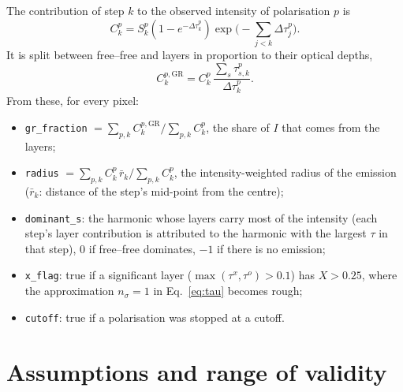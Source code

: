 \documentclass[11pt,a4paper]{article}
\newcommand{\code}[1]{\texttt{#1}}
\begin{document}
The contribution of step $k$ to the observed intensity of polarisation $p$ is
\begin{equation}
  C^p_k=S^p_k\left(1-e^{-\Delta\tau^p_k}\right)\exp\!\Big(-\sum_{j<k}\Delta\tau^p_j\Big).
\end{equation}
It is split between free--free and layers in proportion to their optical depths,
\begin{equation}
  C^{p,\text{GR}}_k=C^p_k\,\frac{\sum_s\tau^p_{s,k}}{\Delta\tau^p_k}.
\end{equation}
From these, for every pixel:
\begin{itemize}
  \item \code{gr\_fraction} $=\sum_{p,k}C^{p,\text{GR}}_k\big/\sum_{p,k}C^p_k$, the share of $I$
        that comes from the layers;
  \item \code{radius} $=\sum_{p,k}C^p_k\,\bar r_k\big/\sum_{p,k}C^p_k$, the intensity-weighted
        radius of the emission ($\bar r_k$: distance of the step's mid-point from the centre);
  \item \code{dominant\_s}: the harmonic whose layers carry most of the intensity (each step's
        layer contribution is attributed to the harmonic with the largest $\tau$ in that step),
        0 if free--free dominates, $-1$ if there is no emission;
  \item \code{x\_flag}: true if a significant layer ($\max(\tau^x,\tau^o)>0.1$) has
        $X>0.25$, where the approximation $n_\sigma=1$ in Eq.~\eqref{eq:tau} becomes rough;
  \item \code{cutoff}: true if a polarisation was stopped at a cutoff.
\end{itemize}

\section{Assumptions and range of validity}\label{sec:limits}
\end{document}
